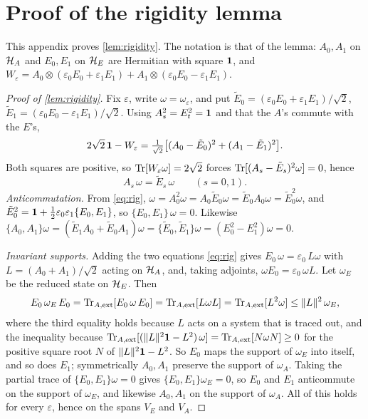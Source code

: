 \section{Proof of the rigidity lemma}\label{app:rigidity}

This appendix proves \cref{lem:rigidity}. The notation is that of the lemma: $A_0,A_1$ on $\mathcal{H}_A$ and $E_0,E_1$
on $\mathcal{H}_E$ are Hermitian with square $\mathbf{1}$, and
$W_\varepsilon=A_0\otimes(\varepsilon_0E_0+\varepsilon_1E_1)+A_1\otimes(\varepsilon_0E_0-\varepsilon_1E_1)$.

\begin{proof}[Proof of \cref{lem:rigidity}]
Fix $\varepsilon$, write $\omega=\omega_\varepsilon$, and put
$\tilde E_0=(\varepsilon_0E_0+\varepsilon_1E_1)/\sqrt2$, $\tilde E_1=(\varepsilon_0E_0-\varepsilon_1E_1)/\sqrt2$.
Using $A_s^2=E_t^2=\mathbf{1}$ and that the $A$'s commute with the $E$'s,
\[
2\sqrt2\,\mathbf{1}-W_\varepsilon=\tfrac{1}{\sqrt2}\bigl[(A_0-\tilde E_0)^2+(A_1-\tilde E_1)^2\bigr].
\]
Both squares are positive, so $\operatorname{Tr}[W_\varepsilon\omega]=2\sqrt2$ forces $\operatorname{Tr}[(A_s-\tilde E_s)^2\omega]=0$, hence
\begin{equation}\label{eq:rig}
A_s\,\omega=\tilde E_s\,\omega\qquad(s=0,1).
\end{equation}
\emph{Anticommutation.} From \eqref{eq:rig},
$\omega=A_0^2\omega=A_0\tilde E_0\omega=\tilde E_0A_0\omega=\tilde E_0^2\omega$, and
$\tilde E_0^2=\mathbf{1}+\tfrac12\varepsilon_0\varepsilon_1\{E_0,E_1\}$, so $\{E_0,E_1\}\,\omega=0$. Likewise
$\{A_0,A_1\}\omega=(\tilde E_1A_0+\tilde E_0A_1)\omega=\{\tilde E_0,\tilde E_1\}\omega=(E_0^2-E_1^2)\omega=0$.

\emph{Invariant supports.} Adding the two equations \eqref{eq:rig} gives $E_0\,\omega=\varepsilon_0\,L\omega$ with
$L=(A_0+A_1)/\sqrt2$ acting on $\mathcal{H}_A$, and, taking adjoints, $\omega E_0=\varepsilon_0\,\omega L$. Let $\omega_E$
be the reduced state on $\mathcal{H}_E$. Then
\[
E_0\,\omega_E\,E_0=\operatorname{Tr}_{A,\mathrm{ext}}[E_0\,\omega\,E_0]=\operatorname{Tr}_{A,\mathrm{ext}}[L\omega L]=\operatorname{Tr}_{A,\mathrm{ext}}[L^2\omega]
\le\lVert L\rVert^2\,\omega_E ,
\]
where the third equality holds because $L$ acts on a system that is traced out, and the inequality because
$\operatorname{Tr}_{A,\mathrm{ext}}[(\lVert L\rVert^2\mathbf{1}-L^2)\,\omega]=\operatorname{Tr}_{A,\mathrm{ext}}[N\omega N]\ge0$ for the positive
square root $N$ of $\lVert L\rVert^2\mathbf{1}-L^2$. So $E_0$ maps the support of $\omega_E$ into itself, and so does
$E_1$; symmetrically $A_0,A_1$ preserve the support of $\omega_A$. Taking the partial trace of
$\{E_0,E_1\}\omega=0$ gives $\{E_0,E_1\}\omega_E=0$, so $E_0$ and $E_1$ anticommute on the support of $\omega_E$,
and likewise $A_0,A_1$ on the support of $\omega_A$. All of this holds for every $\varepsilon$, hence on the spans
$V_E$ and $V_A$.


\end{proof}
